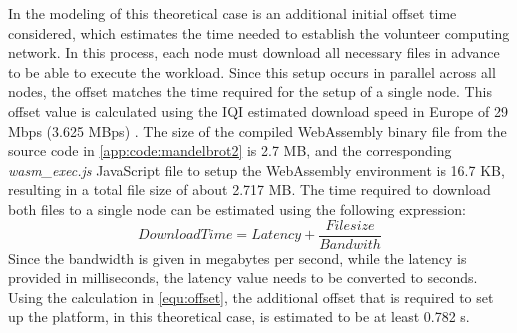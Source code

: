 In the modeling of this theoretical case is an additional initial offset time considered, which estimates the time needed to establish the volunteer computing network. In this process, each node must download all necessary files in advance to be able to execute the workload. Since this setup occurs in parallel across all nodes, the offset matches the time required for the setup of a single node. This offset value is calculated using the \ac{IQI} estimated download speed in Europe of 29 Mbps (3.625 MBps) \cite{backend:latency}. The size of the compiled WebAssembly binary file from the source code in \autoref{app:code:mandelbrot2} is 2.7 MB, and the corresponding \emph{wasm\_exec.js} JavaScript file to setup the WebAssembly environment is 16.7 KB, resulting in a total file size of about 2.717 MB. The time required to download both files to a single node can be estimated using the following expression:
\begin{equation}
  DownloadTime = Latency + \frac{Filesize}{Bandwith} 
  \label{equ:offset}
\end{equation}
Since the bandwidth is given in megabytes per second, while the latency is provided in milliseconds, the latency value needs to be converted to seconds. Using the calculation in \eqref{equ:offset}, the additional offset that is required to set up the platform, in this theoretical case, is estimated to be at least 0.782 s.

